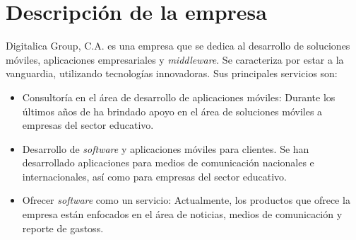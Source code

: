 \section{Descripción de la empresa} \label{Descripcion de la empresa}

Digitalica Group, C.A. es una empresa que se dedica al desarrollo de soluciones móviles, aplicaciones empresariales y \textit{middleware}. Se caracteriza por estar a la vanguardia, utilizando tecnologías innovadoras\cite{DIG1}. Sus principales servicios son:

\begin{itemize}
\item Consultoría en el área de desarrollo de aplicaciones móviles: Durante los últimos años  de ha brindado apoyo en el área de soluciones móviles a empresas del sector educativo.
\item Desarrollo de \textit{software} y aplicaciones móviles para clientes. Se han desarrollado aplicaciones para medios de comunicación nacionales e internacionales, así como para empresas del sector educativo.
\item Ofrecer \textit{software} como un servicio: Actualmente, los productos que ofrece la empresa están enfocados en el área de noticias, medios de comunicación y reporte de gastoss. 
\end{itemize}
